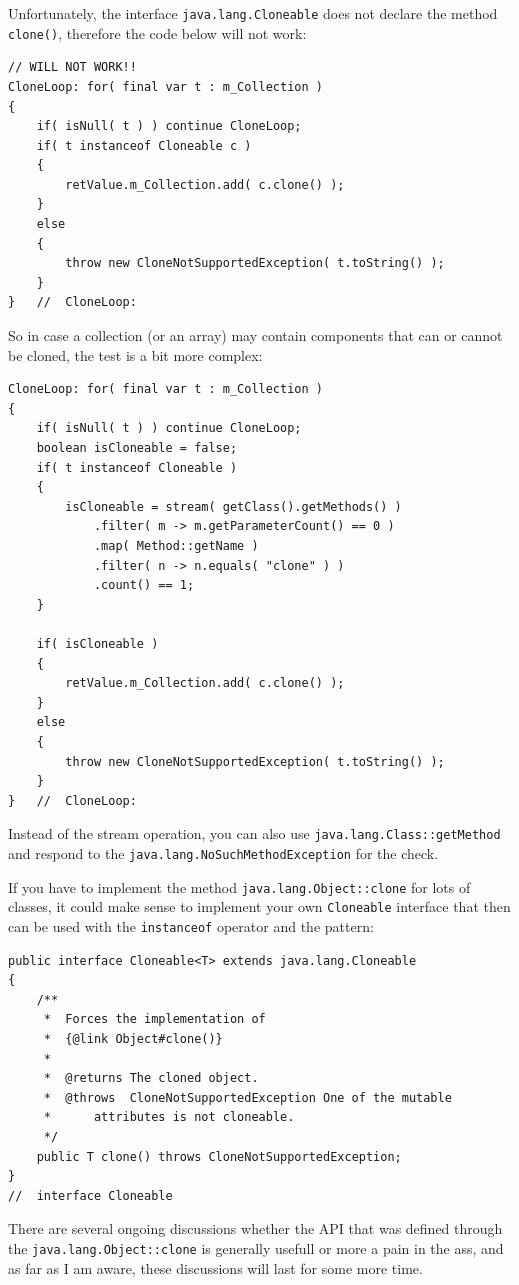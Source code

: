 \documentclass[11pt,a4paper, titlepage, parskip=half, headsepline, footsepline, cleardoublepage=current, headheight=1cm]{scrbook}
\begin{document}
Unfortunately, the interface \lstinline|java.lang.Cloneable| does not declare the method \lstinline|clone()|, therefore the code below will not work:
\begin{lstlisting}
// WILL NOT WORK!!
CloneLoop: for( final var t : m_Collection ) 
{
    if( isNull( t ) ) continue CloneLoop;
    if( t instanceof Cloneable c )
    {
        retValue.m_Collection.add( c.clone() );
    }
    else
    {
        throw new CloneNotSupportedException( t.toString() );
    }    
}   //  CloneLoop:
\end{lstlisting}

So in case a collection (or an array) may contain components that can or cannot be cloned, the test is a bit more complex:
\begin{lstlisting}
CloneLoop: for( final var t : m_Collection ) 
{
    if( isNull( t ) ) continue CloneLoop;
    boolean isCloneable = false;
    if( t instanceof Cloneable )
    {
    	isCloneable = stream( getClass().getMethods() )
    	    .filter( m -> m.getParameterCount() == 0 )
    	    .map( Method::getName )
    	    .filter( n -> n.equals( "clone" ) )
    	    .count() == 1;
    }
    
    if( isCloneable )
    {
        retValue.m_Collection.add( c.clone() );
    }
    else
    {
        throw new CloneNotSupportedException( t.toString() );
    }    
}   //  CloneLoop:
\end{lstlisting}
Instead of the stream operation, you can also use \lstinline|java.lang.Class::getMethod| and respond to the \lstinline|java.lang.NoSuchMethodException| for the check.

If you have to implement the method \lstinline|java.lang.Object::clone| for lots of classes, it could make sense to implement your own \lstinline|Cloneable| interface that then can be used with the \lstinline|instanceof| operator and the pattern:
\begin{lstlisting}
public interface Cloneable<T> extends java.lang.Cloneable
{
    /**
     *  Forces the implementation of
     *  {@link Object#clone()}
     *
     *  @returns The cloned object.
     *  @throws  CloneNotSupportedException One of the mutable
     *      attributes is not cloneable.
     */
    public T clone() throws CloneNotSupportedException; 
}
//  interface Cloneable
\end{lstlisting}

There are several ongoing discussions whether the API that was defined through the \lstinline|java.lang.Object::clone| is generally usefull or more a pain in the ass, and as far as I am aware, these discussions will last for some more time.
\end{document}
